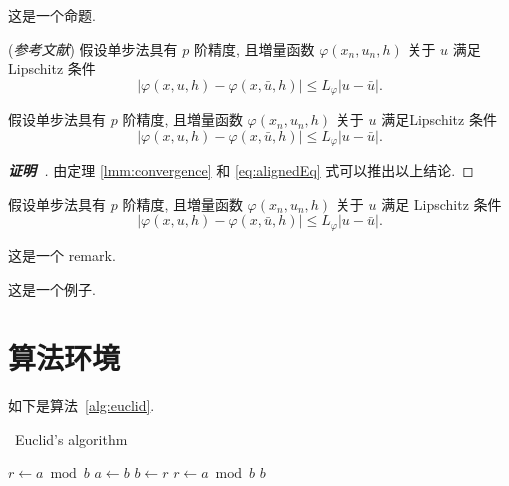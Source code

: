 \begin{proposition}[Proposition]
这是一个命题.
\end{proposition}

\begin{lemma}\label{lmm:convergence} {\upshape (\textit{参考文献}\cite{LiLiu1997})}
假设单步法具有 $p$ 阶精度, 且増量函数 $\varphi(x_{n}, u_{n}, h)$ 关于 $u$ 满足 Lipschitz 条件
\begin{equation}\label{eq:conver1}
|\varphi(x, u, h)-\varphi(x, \bar{u}, h)| \leqslant L_{\varphi}|u-\bar{u}|.
\end{equation}
\end{lemma}

\begin{theorem}\label{thm:convergence}
假设单步法具有 $p$ 阶精度, 且増量函数 $\varphi(x_{n}, u_{n}, h)$ 关于 $u$ 满足Lipschitz 条件
\begin{equation}\label{eq:conver2}
|\varphi(x, u, h)-\varphi(x, \bar{u}, h)| \leqslant L_{\varphi}|u-\bar{u}|.
\end{equation}
\end{theorem}
\begin{proof}[\normalfont\bfseries 证明~\nopunct]
由定理 \ref{lmm:convergence} 和 \eqref{eq:alignedEq} 式可以推出以上结论.
\end{proof}

\begin{corollary}\label{col:convergence}
假设单步法具有 $p$ 阶精度, 且増量函数 $\varphi(x_{n}, u_{n}, h)$ 关于 $u$ 满足 Lipschitz 条件
\begin{equation}\label{eq:conver3}
|\varphi(x, u, h)-\varphi(x, \bar{u}, h)| \leqslant L_{\varphi}|u-\bar{u}|.
\end{equation}
\end{corollary}

\begin{remark}\label{rem:remark}
这是一个 remark.
\end{remark}

\begin{example}
这是一个例子.
\end{example}


\clearpage
\section{算法环境}

如下是算法~\ref{alg:euclid}.
\begin{algorithm}[H]
\small
\caption{~Euclid's algorithm}\label{alg:euclid}
\begin{algorithmic}[1]
  \State $r\gets a\bmod b$
  \State $a\gets b$
  \State $b\gets r$
  \State $r\gets a\bmod b$
  \EndWhile\label{euclidendwhile}
  \State \Return $b$
  \EndProcedure
\end{algorithmic}
\end{algorithm}


